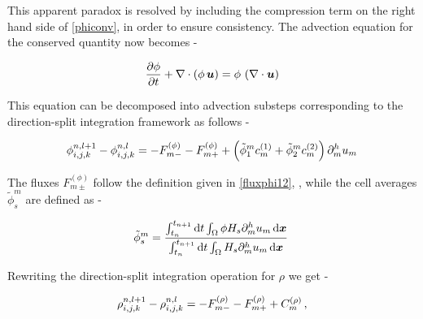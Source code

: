 This apparent paradox is resolved by including the 
compression term on the right hand side of \eqref{phiconv},
in order to ensure consistency. 
The advection equation for the conserved quantity now becomes - 


\begin{align}
\frac{\partial \phi}{\partial t} + \nabla \cdot ( \phi \,\boldsymbol{u})  = \phi \, \left(\nabla \cdot \boldsymbol{u}\right) 
\label{phiconv2}
\end{align}


This equation can be decomposed into advection substeps corresponding to 
the direction-split integration framework as follows - 



\begin{align}
{\phi_{i,j,k}^{n,l+1} - \phi_{i,j,k}^{n,l}} = - F^{(\phi)}_{m-} - F^{(\phi)}_{m+} 
+ \Big( \tilde \phi_1^m c^{(1)}_m + \tilde \phi_2^m c^{(2)}_m \Big) \, \partial_{m}^h u_m 
\label{sumfpconsistent}
\end{align}




The fluxes $F^{(\phi)}_{m\pm}$ follow the definition given in \eqref{fluxphi12}, 
, while the cell averages $\tilde \phi_s^m$ are defined as - 


\begin{align}
\tilde \phi_s^m = \frac{\int_{t_n}^{t_{n+1}} {\textrm{d}}t \int_{\Omega}  \phi  H_s  
\partial_{m}^h u_m  \,  {\textrm{d}}\boldsymbol{x}}
{\int_{t_n}^{t_{n+1}} {\textrm{d}}t \int_{\Omega} H_s  \partial_{m}^h u_m \,{\textrm{d}}\boldsymbol{x}} \,
\label{cellphi2}
\end{align}


Rewriting the direction-split integration operation for $\rho$ we get - 




\begin{align}
{\rho_{i,j,k}^{n,l+1} - \rho_{i,j,k}^{n,l}} = - F^{(\rho)}_{m-} - F^{(\rho)}_{m+} + C_m^{(\rho)}\,,
\label{sumfrho}
\end{align}


